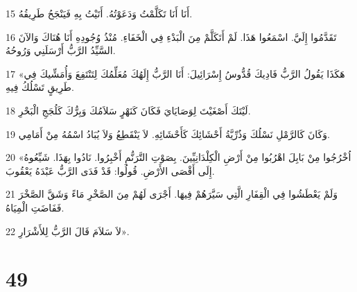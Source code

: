 \par 15 أَنَا أَنَا تَكَلَّمْتُ وَدَعَوْتُهُ. أَتَيْتُ بِهِ فَيَنْجَحُ طَرِيقُهُ.
\par 16 تَقَدَّمُوا إِلَيَّ. اسْمَعُوا هَذَا. لَمْ أَتَكَلَّمْ مِنَ الْبَدْءِ فِي الْخَفَاءِ. مُنْذُ وُجُودِهِ أَنَا هُنَاكَ وَالآنَ السَّيِّدُ الرَّبُّ أَرْسَلَنِي وَرُوحُهُ.
\par 17 «هَكَذَا يَقُولُ الرَّبُّ فَادِيكَ قُدُّوسُ إِسْرَائِيلَ: أَنَا الرَّبُّ إِلَهُكَ مُعَلِّمُكَ لِتَنْتَفِعَ وَأُمَشِّيكَ فِي طَرِيقٍ تَسْلُكُ فِيهِ.
\par 18 لَيْتَكَ أَصْغَيْتَ لِوَصَايَايَ فَكَانَ كَنَهْرٍ سَلاَمُكَ وَبِرُّكَ كَلُجَجِ الْبَحْرِ.
\par 19 وَكَانَ كَالرَّمْلِ نَسْلُكَ وَذُرِّيَّةُ أَحْشَائِكَ كَأَحْشَائِهِ. لاَ يَنْقَطِعُ وَلاَ يُبَادُ اسْمُهُ مِنْ أَمَامِي.
\par 20 «اُخْرُجُوا مِنْ بَابِلَ اهْرُبُوا مِنْ أَرْضِ الْكِلْدَانِيِّينَ. بِصَوْتِ التَّرَنُّمِ أَخْبِرُوا. نَادُوا بِهَذَا. شَيِّعُوهُ إِلَى أَقْصَى الأَرْضِ. قُولُوا: قَدْ فَدَى الرَّبُّ عَبْدَهُ يَعْقُوبَ.
\par 21 وَلَمْ يَعْطَشُوا فِي الْقِفَارِ الَّتِي سَيَّرَهُمْ فِيهَا. أَجْرَى لَهُمْ مِنَ الصَّخْرِ مَاءً وَشَقَّ الصَّخْرَ فَفَاضَتِ الْمِيَاهُ.
\par 22 لاَ سَلاَمَ قَالَ الرَّبُّ لِلأَشْرَارِ».

\chapter{49}

